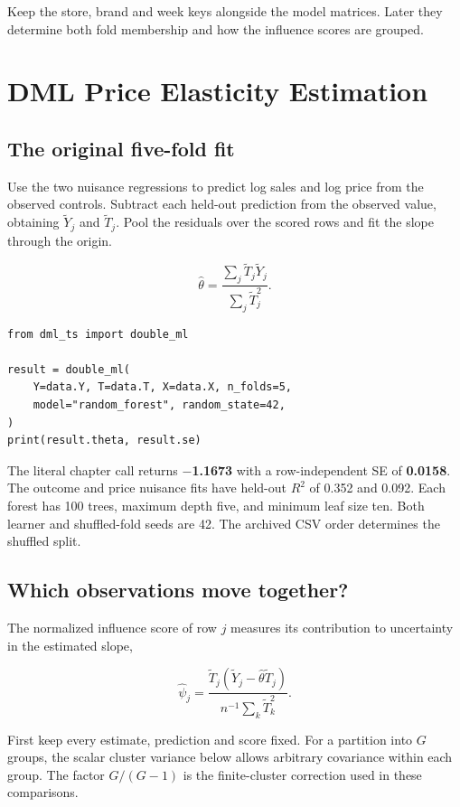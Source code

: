 Keep the store, brand and week keys alongside the model matrices. Later they determine both fold membership and how the influence scores are grouped.

\section{DML Price Elasticity Estimation}\label{sec:dml_estimation}

\subsection{The original five-fold fit}

Use the two nuisance regressions to predict log sales and log price from the observed controls. Subtract each held-out prediction from the observed value, obtaining \(\tilde Y_j\) and \(\tilde T_j\). Pool the residuals over the scored rows and fit the slope through the origin.

\[
\hat\theta = \frac{\sum_j \tilde T_j\tilde Y_j}{\sum_j \tilde T_j^2}.
\]

\begin{verbatim}
from dml_ts import double_ml

result = double_ml(
    Y=data.Y, T=data.T, X=data.X, n_folds=5,
    model="random_forest", random_state=42,
)
print(result.theta, result.se)
\end{verbatim}

The literal chapter call returns \textbf{\ensuremath{-}1.1673} with a row-independent SE of \textbf{0.0158}. The outcome and price nuisance fits have held-out \(R^2\) of 0.352 and 0.092. Each forest has 100 trees, maximum depth five, and minimum leaf size ten. Both learner and shuffled-fold seeds are 42. The archived CSV order determines the shuffled split.

\subsection{Which observations move together?}

The normalized influence score of row \(j\) measures its contribution to uncertainty in the estimated slope,

\[
\hat\psi_j =
\frac{\tilde T_j(\tilde Y_j-\hat\theta\tilde T_j)}
{n^{-1}\sum_k\tilde T_k^2}.
\]

First keep every estimate, prediction and score fixed. For a partition into \(G\) groups, the scalar cluster variance below allows arbitrary covariance within each group. The factor \(G/(G-1)\) is the finite-cluster correction used in these comparisons.

